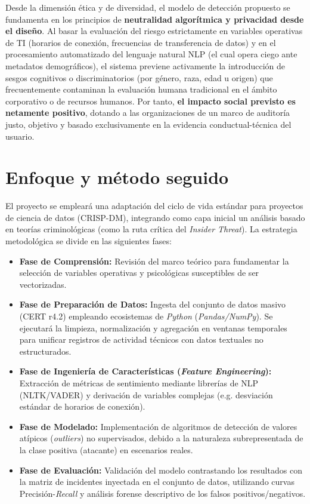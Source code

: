 \documentclass[IB]{TFUOC}%
\begin{document}
\medskip
\noindent Desde la dimensión ética y de diversidad, el modelo de detección propuesto se fundamenta en los principios de \textbf{neutralidad algorítmica y privacidad desde el diseño}. Al basar la evaluación del riesgo estrictamente en variables operativas de TI (horarios de conexión, frecuencias de transferencia de datos) y en el procesamiento automatizado del lenguaje natural NLP (el cual opera ciego ante metadatos demográficos), el sistema previene activamente la introducción de sesgos cognitivos o discriminatorios (por género, raza, edad u origen) que frecuentemente contaminan la evaluación humana tradicional en el ámbito corporativo o de recursos humanos. Por tanto,\textbf{ el impacto social previsto es netamente positivo}, dotando a las organizaciones de un marco de auditoría justo, objetivo y basado exclusivamente en la evidencia conductual-técnica del usuario.


\section{Enfoque y método seguido}

El proyecto se empleará una adaptación del ciclo de vida estándar para proyectos de ciencia de datos (CRISP-DM), integrando como capa inicial un análisis basado en teorías criminológicas (como la ruta crítica del \textit{Insider Threat}). La estrategia metodológica se divide en las siguientes fases:

\begin{itemize}
    \item \textbf{Fase de Comprensión:} Revisión del marco teórico para fundamentar la selección de variables operativas y psicológicas susceptibles de ser vectorizadas.
    \item \textbf{Fase de Preparación de Datos:} Ingesta del conjunto de datos masivo (CERT r4.2) empleando ecosistemas de \textit{Python} (\textit{Pandas/NumPy}). Se ejecutará la limpieza, normalización y agregación en ventanas temporales para unificar registros de actividad técnicos con datos textuales no estructurados.
    \item \textbf{Fase de Ingeniería de Características (\textit{Feature Engineering}):} Extracción de métricas de sentimiento mediante librerías de NLP (NLTK/VADER) y derivación de variables complejas (e.g. desviación estándar de horarios de conexión).
    \item \textbf{Fase de Modelado:} Implementación de algoritmos de detección de valores atípicos (\textit{outliers}) no supervisados, debido a la naturaleza subrepresentada de la clase positiva (atacante) en escenarios reales.
    \item \textbf{Fase de Evaluación:} Validación del modelo contrastando los resultados con la matriz de incidentes inyectada en el conjunto de datos, utilizando curvas Precisión-\textit{Recall} y análisis forense descriptivo de los falsos positivos/negativos.
\end{itemize}
\end{document}
